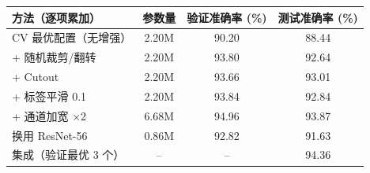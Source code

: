 \begin{tabular}{lccc}
\toprule
方法（逐项累加） & 参数量 & 验证准确率 (\%) & 测试准确率 (\%) \\
\midrule
CV 最优配置（无增强） & 2.20M & 90.20 & 88.44 \\
+ 随机裁剪/翻转 & 2.20M & 93.80 & 92.64 \\
+ Cutout & 2.20M & 93.66 & 93.01 \\
+ 标签平滑 0.1 & 2.20M & 93.84 & 92.84 \\
+ 通道加宽 ×2 & 6.68M & 94.96 & 93.87 \\
换用 ResNet-56 & 0.86M & 92.82 & 91.63 \\
集成（验证最优 3 个） & -- & -- & 94.36 \\
\bottomrule
\end{tabular}
